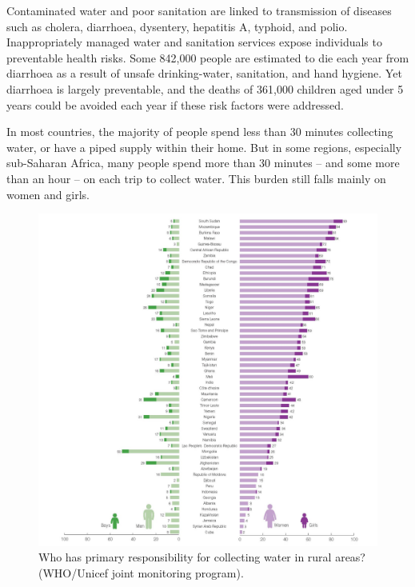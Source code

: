 \documentclass[]{book}
\begin{document}
Contaminated water and poor sanitation are linked to transmission of diseases such as cholera, diarrhoea, dysentery, hepatitis A, typhoid, and polio. Inappropriately managed water and sanitation services expose individuals to preventable health risks. Some 842,000 people are estimated to die each year from diarrhoea as a result of unsafe drinking-water, sanitation, and hand hygiene. Yet diarrhoea is largely preventable, and the deaths of 361,000 children aged under 5 years could be avoided each year if these risk factors were addressed.

In most countries, the majority of people spend less than 30 minutes collecting water, or have a piped supply within their home. But in some regions, especially sub-Saharan Africa, many people spend more than 30 minutes -- and some more than an hour -- on each trip to collect water. This burden still falls mainly on women and girls.

\begin{figure}

{\centering \includegraphics[width=1\linewidth]{figures/1512} 

}

\caption{Who has primary responsibility for collecting water in rural areas? (WHO/Unicef joint monitoring program).}\label{fig:water-girl}
\end{figure}
\end{document}
